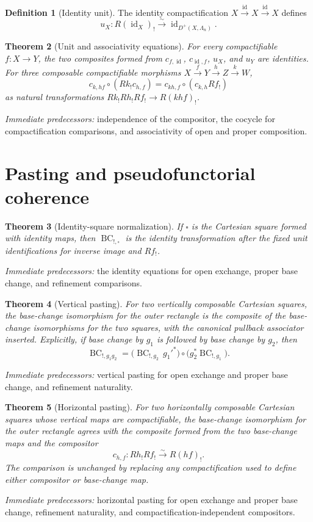 \documentclass[10pt]{article}
\newtheorem{theorem}{Theorem}[section]
\theoremstyle{definition}
\newtheorem{definition}[theorem]{Definition}
\newcommand{\pred}[1]{\par\smallskip\begingroup\footnotesize\raggedright
\emph{Immediate predecessors:} #1.\par\endgroup}
\begin{document}
\begin{definition}[Identity unit]
The identity compactification
\(X\xrightarrow{\operatorname{id}}X\xrightarrow{\operatorname{id}}X\)
defines
\[
 u_X:R(\operatorname{id}_X)_!\xrightarrow{\sim}
 \operatorname{id}_{D^+(X,\Lambda_n)}.
\]
\end{definition}

\begin{theorem}[Unit and associativity equations]
For every compactifiable \(f:X\to Y\), the two composites formed from
\(c_{f,\operatorname{id}}\), \(c_{\operatorname{id},f}\), \(u_X\), and
\(u_Y\) are identities.  For three composable compactifiable morphisms
\(X\xrightarrow{f}Y\xrightarrow{h}Z\xrightarrow{k}W\),
\[
 c_{k,hf}\circ(Rk_!c_{h,f})
 =c_{kh,f}\circ(c_{k,h}Rf_!)
\]
as natural transformations \(Rk_!Rh_!Rf_!\to R(khf)_!\).
\end{theorem}
\pred{independence of the compositor, the cocycle for compactification comparisons, and associativity of open and proper composition}

\section{Pasting and pseudofunctorial coherence}

\begin{theorem}[Identity-square normalization]
If \(\square\) is the Cartesian square formed with identity maps, then
\(\operatorname{BC}_{!,\square}\) is the identity transformation after the
fixed unit identifications for inverse image and \(Rf_!\).
\end{theorem}
\pred{the identity equations for open exchange, proper base change, and refinement comparisons}

\begin{theorem}[Vertical pasting]
For two vertically composable Cartesian squares, the base-change
isomorphism for the outer rectangle is the composite of the base-change
isomorphisms for the two squares, with the canonical pullback associator
inserted.  Explicitly, if base change by \(g_1\) is followed by base change
by \(g_2\), then
\[
 \operatorname{BC}_{!,g_1g_2}
 =
 \bigl(\operatorname{BC}_{!,g_2}\,g_1'^*\bigr)
 \circ
 \bigl(g_2^*\operatorname{BC}_{!,g_1}\bigr).
\]
\end{theorem}
\pred{vertical pasting for open exchange and proper base change, and refinement naturality}

\begin{theorem}[Horizontal pasting]
For two horizontally composable Cartesian squares whose vertical maps are
compactifiable, the base-change isomorphism for the outer rectangle agrees
with the composite formed from the two base-change maps and the compositor
\[
 c_{h,f}:Rh_!Rf_!\xrightarrow{\sim}R(hf)_!.
\]
The comparison is unchanged by replacing any compactification used to
define either compositor or base-change map.
\end{theorem}
\pred{horizontal pasting for open exchange and proper base change, refinement naturality, and compactification-independent compositors}
\end{document}
